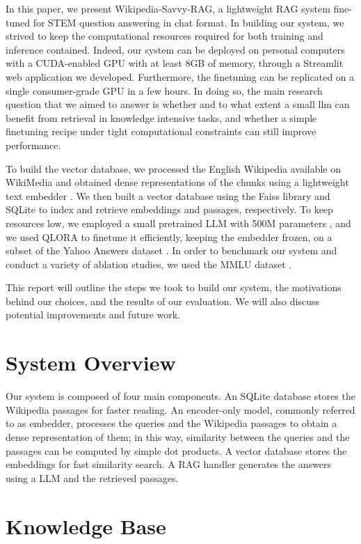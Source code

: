 \documentclass[11pt]{article}
\begin{document}
In this paper, we present Wikipedia-Savvy-RAG, a lightweight RAG system fine-tuned for STEM question answering
in chat format. In building our system, we strived to keep the computational resources required for both
training and inference contained. Indeed, our system can be deployed on personal computers with a CUDA-enabled GPU
with at least 8GB of memory, through a Streamlit web application we developed. Furthermore, the finetuning can 
be replicated on a single consumer-grade GPU in a few hours. In doing so, the main research question that we aimed to
answer is whether and to what extent a small llm can benefit from retrieval in knowledge intensive tasks, and whether a
simple finetuning recipe under tight computational constraints can still improve performance. 

To build the vector database, we processed the English Wikipedia available on WikiMedia \cite{wikimedia} and obtained 
dense representations of the chunks using a lightweight text embedder \cite{baai}. We then built a vector database using
the Faiss library \cite{faiss} and SQLite \cite{sqlite} to index and retrieve embeddings and passages, respectively. To keep resources low,
we employed a small pretrained LLM with 500M parameters \cite{qwen}, and we used QLORA \cite{qlora} to finetune it efficiently, 
keeping the embedder frozen, on a subset of the Yahoo Answers dataset \cite{yahoo_answers}.
In order to benchmark our system and conduct a variety of ablation studies, we used the MMLU dataset \cite{mmlu}.

This report will outline the steps we took to build our system, the motivations behind our choices, and the results of our evaluation.
We will also discuss potential improvements and future work.

\section{System Overview}
Our system is composed of four main components.
An SQLite database stores the Wikipedia passages for faster reading.
An encoder-only model, commonly referred to as embedder, processes the queries and the 
Wikipedia passages to obtain a dense representation of them; in this way, similarity 
between the queries and the passages can be computed by simple dot products.
A vector database stores the embeddings for fast similarity search.
A RAG handler generates the answers using a LLM and the retrieved passages.

\section{Knowledge Base}
\end{document}
